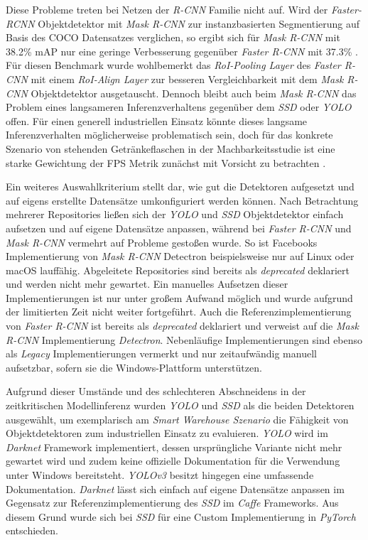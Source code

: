 Diese Probleme treten bei Netzen der \textit{R-CNN} Familie nicht auf. Wird der \textit{Faster-RCNN} Objektdetektor mit \textit{Mask R-CNN} zur instanzbasierten Segmentierung auf Basis des COCO Datensatzes verglichen, so ergibt sich für \textit{Mask R-CNN} mit 38.2\% mAP nur eine geringe Verbesserung gegenüber \textit{Faster R-CNN} mit 37.3\% \cite{KaimingHeGeorgiaGkioxariPiotrDollarRossGirshick.20180224}. Für diesen Benchmark wurde wohlbemerkt das \textit{RoI-Pooling Layer} des \textit{Faster R-CNN} mit einem \textit{RoI-Align Layer} zur besseren Vergleichbarkeit mit dem \textit{Mask R-CNN} Objektdetektor ausgetauscht. Dennoch bleibt auch beim \textit{Mask R-CNN} das Problem eines langsameren Inferenzverhaltens gegenüber dem \textit{SSD} oder \textit{YOLO} offen. Für einen generell industriellen Einsatz könnte dieses langsame Inferenzverhalten möglicherweise problematisch sein, doch für das konkrete Szenario von stehenden Getränkeflaschen in der Machbarkeitsstudie ist eine starke Gewichtung der FPS Metrik zunächst mit Vorsicht zu betrachten \cite{IntanPurnamasar.20181215}. 

Ein weiteres Auswahlkriterium stellt dar, wie gut die Detektoren aufgesetzt und auf eigens erstellte Datensätze umkonfiguriert werden können. Nach Betrachtung mehrerer Repositories ließen sich der \textit{YOLO} und \textit{SSD} Objektdetektor einfach aufsetzen und auf eigene Datensätze anpassen, während bei \textit{Faster R-CNN} und \textit{Mask R-CNN} vermehrt auf Probleme gestoßen wurde. So ist Facebooks Implementierung von \textit{Mask R-CNN} \glqq Detectron\grqq{} beispielsweise nur auf Linux oder macOS lauffähig. Abgeleitete Repositories sind bereits als \textit{deprecated} deklariert und werden nicht mehr gewartet. Ein manuelles Aufsetzen dieser Implementierungen ist nur unter großem Aufwand möglich und wurde aufgrund der limitierten Zeit nicht weiter fortgeführt. Auch die Referenzimplementierung von \textit{Faster R-CNN} ist bereits als \textit{deprecated} deklariert und verweist auf die \textit{Mask R-CNN} Implementierung \textit{Detectron}. Nebenläufige Implementierungen sind ebenso als \textit{Legacy} Implementierungen vermerkt und nur zeitaufwändig manuell aufsetzbar, sofern sie die Windows-Plattform unterstützen.

Aufgrund dieser Umstände und des schlechteren Abschneidens in der zeitkritischen Modellinferenz wurden \textit{YOLO} und \textit{SSD} als die beiden Detektoren ausgewählt, um exemplarisch am \textit{Smart Warehouse Szenario} die Fähigkeit von Objektdetektoren zum industriellen Einsatz zu evaluieren. \textit{YOLO} wird im \textit{Darknet} Framework implementiert, dessen ursprüngliche Variante nicht mehr gewartet wird und zudem keine offizielle Dokumentation für die Verwendung unter Windows bereitsteht. \textit{YOLOv3} besitzt hingegen eine umfassende Dokumentation. \textit{Darknet} lässt sich einfach auf eigene Datensätze anpassen im Gegensatz zur Referenzimplementierung des \textit{SSD} im \textit{Caffe} Frameworks. Aus diesem Grund wurde sich bei \textit{SSD} für eine Custom Implementierung in \textit{PyTorch} entschieden.